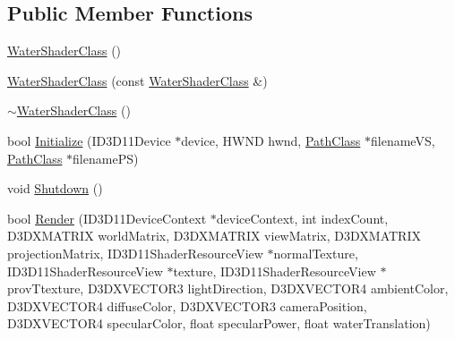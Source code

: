 \subsection*{Public Member Functions}
\begin{DoxyCompactItemize}
\item 
\hyperlink{class_water_shader_class_a589f7d006b39c9d21375cf05dcf73958}{Water\+Shader\+Class} ()
\item 
\hyperlink{class_water_shader_class_a8710df383a9538ecff81220182c4ef3a}{Water\+Shader\+Class} (const \hyperlink{class_water_shader_class}{Water\+Shader\+Class} \&)
\item 
\hyperlink{class_water_shader_class_ab358350351c57fc6210afd8e10dc25fb}{$\sim$\+Water\+Shader\+Class} ()
\item 
bool \hyperlink{class_water_shader_class_a413d473dda4a1f5cc34346172f02b54d}{Initialize} (I\+D3\+D11\+Device $\ast$device, H\+W\+ND hwnd, \hyperlink{class_path_class}{Path\+Class} $\ast$filename\+VS, \hyperlink{class_path_class}{Path\+Class} $\ast$filename\+PS)
\item 
void \hyperlink{class_water_shader_class_ac6a4df71a7ea569e31b744542a164a1a}{Shutdown} ()
\item 
bool \hyperlink{class_water_shader_class_a30a352661389e8e8448bbc6ce22194c6}{Render} (I\+D3\+D11\+Device\+Context $\ast$device\+Context, int index\+Count, D3\+D\+X\+M\+A\+T\+R\+IX world\+Matrix, D3\+D\+X\+M\+A\+T\+R\+IX view\+Matrix, D3\+D\+X\+M\+A\+T\+R\+IX projection\+Matrix, I\+D3\+D11\+Shader\+Resource\+View $\ast$normal\+Texture, I\+D3\+D11\+Shader\+Resource\+View $\ast$texture, I\+D3\+D11\+Shader\+Resource\+View $\ast$prov\+Ttexture, D3\+D\+X\+V\+E\+C\+T\+O\+R3 light\+Direction, D3\+D\+X\+V\+E\+C\+T\+O\+R4 ambient\+Color, D3\+D\+X\+V\+E\+C\+T\+O\+R4 diffuse\+Color, D3\+D\+X\+V\+E\+C\+T\+O\+R3 camera\+Position, D3\+D\+X\+V\+E\+C\+T\+O\+R4 specular\+Color, float specular\+Power, float water\+Translation)
\end{DoxyCompactItemize}
